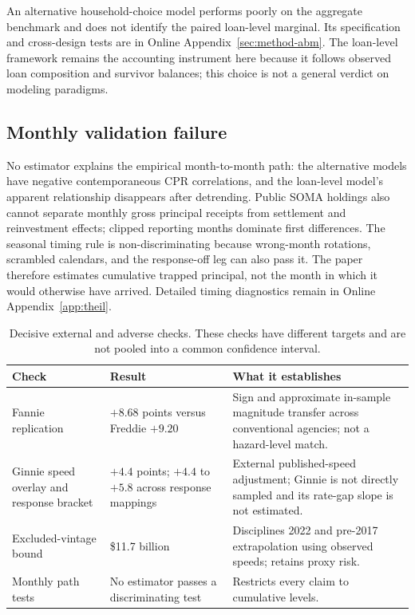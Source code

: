 An alternative household-choice model performs poorly on the aggregate benchmark and does not identify the paired loan-level marginal. Its specification and cross-design tests are in Online Appendix~\ref{sec:method-abm}. The loan-level framework remains the accounting instrument here because it follows observed loan composition and survivor balances; this choice is not a general verdict on modeling paradigms.

\subsection{Monthly validation failure}

No estimator explains the empirical month-to-month path: the alternative models have negative contemporaneous CPR correlations, and the loan-level model's apparent relationship disappears after detrending. Public SOMA holdings also cannot separate monthly gross principal receipts from settlement and reinvestment effects; clipped reporting months dominate first differences. The seasonal timing rule is non-discriminating because wrong-month rotations, scrambled calendars, and the response-off leg can also pass it. The paper therefore estimates cumulative trapped principal, not the month in which it would otherwise have arrived. Detailed timing diagnostics remain in Online Appendix~\ref{app:theil}.

\begin{table}[H]
\centering
\small
\caption{Decisive external and adverse checks. These checks have different targets and are not pooled into a common confidence interval.}
\label{tab:validation}\label{tab:crossdesign}\label{tab:wal}
\begin{tabular}{@{}p{4.0cm}p{4.0cm}p{6.5cm}@{}}
\toprule
Check & Result & What it establishes \\
\midrule
Fannie replication & $+8.68$ points versus Freddie $+9.20$ & Sign and approximate in-sample magnitude transfer across conventional agencies; not a hazard-level match. \\
Ginnie speed overlay and response bracket & $+4.4$ points; $+4.4$ to $+5.8$ across response mappings & External published-speed adjustment; Ginnie is not directly sampled and its rate-gap slope is not estimated. \\
Excluded-vintage bound & \$11.7 billion & Disciplines 2022 and pre-2017 extrapolation using observed speeds; retains proxy risk. \\
Monthly path tests & No estimator passes a discriminating test & Restricts every claim to cumulative levels. \\
\bottomrule
\end{tabular}
\end{table}

